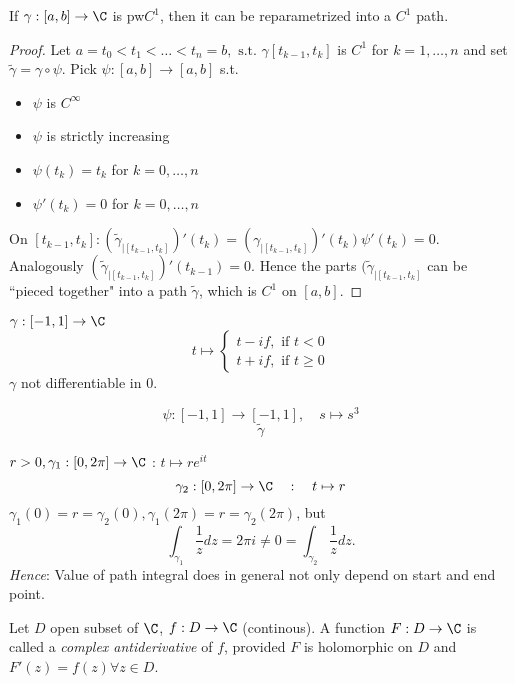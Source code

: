 \begin{remark}
  If $\gamma:[a,b]\to \C$ is pw$C^1$, then it can be reparametrized into a $C^1$ path.
\end{remark}
\begin{proof}
  Let $a=t_0<t_1 < \dots < t_n=b, \text{ s.t. }\gamma[t_{k-1},t_k]$ is $C^1$ for $k=1,\dots,n$ and set $\tilde{\gamma}=\gamma \circ \psi$.
  Pick $\psi:[a,b]\to [a,b]$ s.t.
  \begin{itemize}
    \item $\psi$ is $C^{\infty}$
    \item $\psi$ is strictly increasing
    \item $\psi(t_k)=t_k$ for $k=0,\dots,n$
    \item $\psi'(t_k)=0$ for $k=0,\dots,n$
  \end{itemize}
  On $[t_{k-1},t_k]:\left(\tilde{\gamma}_{\rvert [t_{k-1},t_k]}\right)'(t_k)=\left(\gamma_{\rvert [t_{k-1},t_k]}\right)'(t_k)\psi'(t_k)=0$.
  Analogously $\left(\tilde{\gamma}_{\rvert[t_{k-1},t_k]}\right)'(t_{k-1})=0$. Hence the parts $(\tilde{\gamma}_{\rvert [t_{k-1},t_k]}$ can be ``pieced together" into a path $\tilde{\gamma}$, which is $C^1$ on $[a,b]$.
  \qedhere
\end{proof}

\begin{example}
  $\gamma:[-1,1]\to \C$
  $$t\mapsto \begin{cases}
    t-if, \text{ if }t<0 \\
    t+if, \text{ if }t\geq 0
  \end{cases}$$
  $\gamma$ not differentiable in $0$.
\end{example}

$$\psi: [-1,1] \to [-1,1], \quad s\mapsto s^3$$
$$\tilde{\gamma}$$


\begin{example}
  $r>0, \gamma_1:[0,2\pi]\to \C$ : $t\mapsto re^{it}$
  $$\gamma_2:[0,2\pi] \to \C \quad : \quad t\mapsto r$$
  $\gamma_1(0)=r=\gamma_2(0), \gamma_1(2\pi)=r=\gamma_2(2\pi)$, but
    $$\int_{\gamma_1}\frac{1}{z}dz=2\pi i\neq 0 = \int_{\gamma_2} \frac{1}{z}dz.$$
\emph{Hence}:
\newline
  Value of path integral does in general not only depend on start and end point.
\end{example}
\begin{definition}
  Let $D$ open subset of $\C$, $f:D\to \C$ (continous). A function $F:D\to \C$ is called a \emph{complex antiderivative} of $f$, provided $F$ is holomorphic on $D$ and $F'(z)=f(z)\forall z\in D$.
\end{definition}

